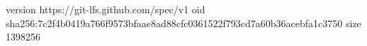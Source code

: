 version https://git-lfs.github.com/spec/v1
oid sha256:7c2f4b0419a766f9573bfaae8ad88cfc0361522f793cd7a60b36acebfa1c3750
size 1398256

